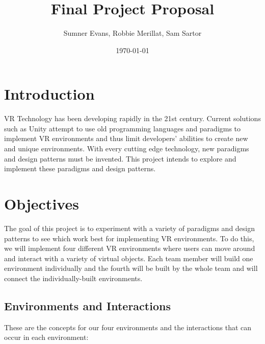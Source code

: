 \documentclass[titlepage,12pt]{article}
\title{Final Project Proposal}
\author{Sumner Evans, Robbie Merillat, Sam Sartor}
\date{\today}
\begin{document}
\maketitle

\section{Introduction}

VR Technology has been developing rapidly in the 21st century. Current solutions
such as Unity attempt to use old programming languages and paradigms to
implement VR environments and thus limit developers' abilities to create new and
unique environments. With every cutting edge technology, new paradigms and
design patterns must be invented. This project intends to explore and implement
these paradigms and design patterns.

\section{Objectives}

The goal of this project is to experiment with a variety of paradigms and design
patterns to see which work best for implementing VR environments. To do this, we
will implement four different VR environments where users can move around and
interact with a variety of virtual objects. Each team member will build one
environment individually and the fourth will be built by the whole team and will
connect the individually-built environments.

\subsection{Environments and Interactions}
These are the concepts for our four environments and the interactions that can
occur in each environment:
\end{document}
